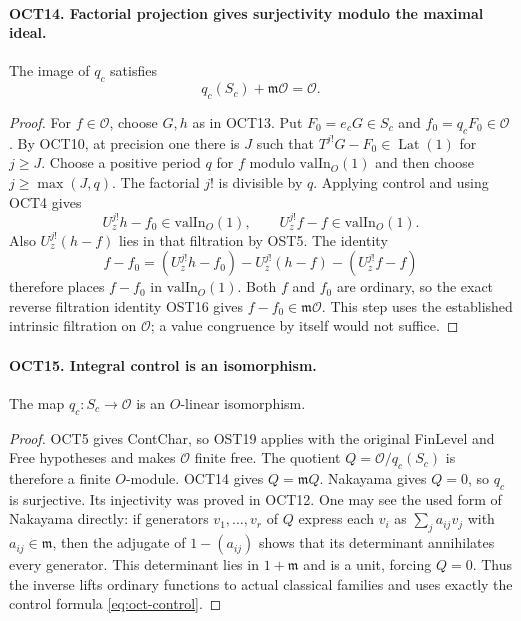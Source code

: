\paragraph{OCT14. Factorial projection gives surjectivity modulo the maximal ideal.}
\label{claim:OCT14}
The image of $q_c$ satisfies
\[
                         q_c(S_c)+\mathfrak m\mathcal O
                                                   =\mathcal O.
\]
\begin{proof}
For $f\in\mathcal O$, choose $G,h$ as in OCT13.  Put
$F_0=e_cG\in S_c$ and $f_0=q_cF_0\in\mathcal O$.
By OCT10, at precision one there is $J$ such that
$T^{j!}G-F_0\in\operatorname{Lat}(1)$ for $j\geq J$.
Choose a positive period $q$ for $f$ modulo
$\mathrm{valIn}_O(1)$ and then choose $j\geq\max(J,q)$.
The factorial $j!$ is divisible by $q$.  Applying control
and using OCT4 gives
\[
 U_z^{j!}h-f_0\in\mathrm{valIn}_O(1),\qquad
 U_z^{j!}f-f\in\mathrm{valIn}_O(1).
\]
Also $U_z^{j!}(h-f)$ lies in that filtration by OST5.
The identity
\[
 f-f_0=(U_z^{j!}h-f_0)-U_z^{j!}(h-f)-(U_z^{j!}f-f)
\]
therefore places $f-f_0$ in $\mathrm{valIn}_O(1)$.
Both $f$ and $f_0$ are ordinary, so the exact reverse
filtration identity OST16 gives
$f-f_0\in\mathfrak m\mathcal O$.
This step uses the established intrinsic filtration on
$\mathcal O$; a value congruence by itself would not suffice.
\end{proof}

\paragraph{OCT15. Integral control is an isomorphism.}
\label{claim:OCT15}
The map $q_c:S_c\to\mathcal O$ is an $O$-linear isomorphism.
\begin{proof}
OCT5 gives ContChar, so OST19 applies with the original
FinLevel and Free hypotheses and makes $\mathcal O$ finite
free.  The quotient $Q=\mathcal O/q_c(S_c)$ is therefore a
finite $O$-module.  OCT14 gives $Q=\mathfrak m Q$.
Nakayama gives $Q=0$, so $q_c$ is surjective.  Its injectivity
was proved in OCT12.  One may see the used form of Nakayama
directly: if generators $v_1,\ldots,v_r$ of $Q$ express each
$v_i$ as $\sum_j a_{ij}v_j$ with $a_{ij}\in\mathfrak m$,
then the adjugate of $1-(a_{ij})$ shows that its determinant
annihilates every generator.  This determinant lies in
$1+\mathfrak m$ and is a unit, forcing $Q=0$.
Thus the inverse lifts ordinary functions to actual classical
families and uses exactly the control formula
\eqref{eq:oct-control}.
\end{proof}

